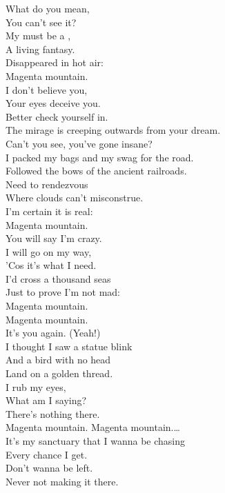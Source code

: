 What do you mean, \\
You can't see it? \\
My  must be a , \\
A living fantasy. \\
Disappeared in hot air: \\
Magenta mountain. \\

I don't believe you, \\
Your eyes deceive you. \\
Better check yourself in. \\
The mirage is creeping outwards from your dream. \\
Can't you see, you've gone insane? \\

I packed my bags and my swag for the road. \\
Followed the bows of the ancient railroads. \\
Need to rendezvous \\
Where clouds can't misconstrue. \\
I'm certain it is real: \\
Magenta mountain. \\

You will say I'm crazy. \\
I will go on my way, \\
'Cos it's what I need. \\
I'd cross a thousand seas \\
Just to prove I'm not mad: \\
Magenta mountain. \\
Magenta mountain. \\

It's you again. (Yeah!) \\
I thought I saw a statue blink \\
And a bird with no head \\
Land on a golden thread. \\
I rub my eyes, \\
What am I saying? \\
There's nothing there. \\

Magenta mountain. Magenta mountain.… \\
It's my sanctuary that I wanna be chasing \\
Every chance I get. \\
Don't wanna be left. \\
Never not making it there. \\


